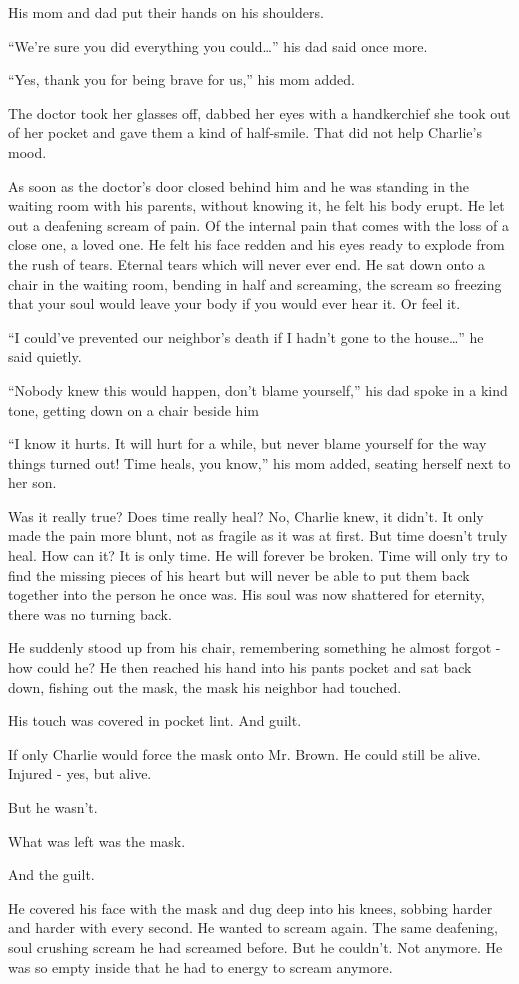 His mom and dad put their hands on his shoulders.

“We're sure you did everything you could…” his dad said once more.

“Yes, thank you for being brave for us,” his mom added.

The doctor took her glasses off, dabbed her eyes with a handkerchief she took out of her pocket and gave them a kind of half-smile. That did not help Charlie's mood.

\bigskip

As soon as the doctor's door closed behind him and he was standing in the waiting room with his parents, without knowing it, he felt his body erupt. He let out a deafening scream of pain. Of the internal pain that comes with the loss of a close one, a loved one. He felt his face redden and his eyes ready to explode from the rush of tears. Eternal tears which will never ever end. He sat down onto a chair in the waiting room, bending in half and screaming, the scream so freezing that your soul would leave your body if you would ever hear it. Or feel it.

“I could've prevented our neighbor's death if I hadn't gone to the house…” he said quietly.

“Nobody knew this would happen, don't blame yourself,” his dad spoke in a kind tone, getting down on a chair beside him

“I know it hurts. It will hurt for a while, but never blame yourself for the way things turned out! Time heals, you know,” his mom added, seating herself next to her son.

Was it really true? Does time really heal? No, Charlie knew, it didn't. It only made the pain more blunt, not as fragile as it was at first. But time doesn't truly heal. How can it? It is only time. He will forever be broken. Time will only try to find the missing pieces of his heart but will never be able to put them back together into the person he once was. His soul was now shattered for eternity, there was no turning back.

He suddenly stood up from his chair, remembering something he almost forgot - how could he? He then reached his hand into his pants pocket and sat back down, fishing out the mask, the mask his neighbor had touched.

His touch was covered in pocket lint. And guilt.

If only Charlie would force the mask onto Mr. Brown. He could still be alive. Injured - yes, but alive.

But he wasn't.

What was left was the mask.

And the guilt.

He covered his face with the mask and dug deep into his knees, sobbing harder and harder with every second. He wanted to scream again. The same deafening, soul crushing scream he had screamed before. But he couldn't. Not anymore. He was so empty inside that he had to energy to scream anymore.
